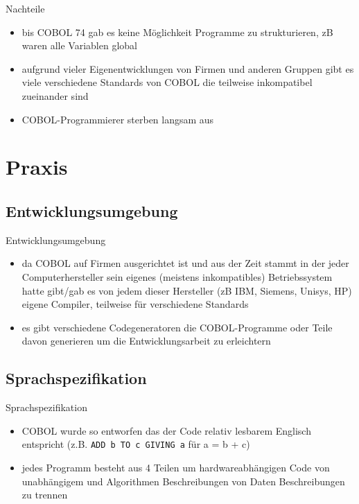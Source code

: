 \documentclass{beamer}
\begin{document}
\begin{frame}{Nachteile}
	\begin{itemize}
		\item
		    bis COBOL 74 gab es keine M\"oglichkeit Programme zu strukturieren, zB waren alle Variablen global
		\item
			aufgrund vieler Eigenentwicklungen von Firmen und anderen Gruppen gibt es viele verschiedene Standards von COBOL die teilweise inkompatibel zueinander sind
		\item
			COBOL-Programmierer sterben langsam aus
	\end{itemize}
\end{frame}

\section{Praxis}

\subsection{Entwicklungsumgebung}

\begin{frame}{Entwicklungsumgebung}
	\begin{itemize}
		\item
			da COBOL auf Firmen ausgerichtet ist und aus der Zeit stammt in der jeder Computerhersteller sein eigenes (meistens inkompatibles) Betriebssystem hatte gibt/gab es von jedem dieser Hersteller (zB IBM, Siemens, Unisys, HP) eigene Compiler, teilweise f\"ur verschiedene Standards
		\item
			es gibt verschiedene Codegeneratoren die COBOL-Programme oder Teile davon generieren um die Entwicklungsarbeit zu erleichtern
	\end{itemize}
\end{frame}

\subsection{Sprachspezifikation}

\begin{frame}{Sprachspezifikation}
	\begin{itemize}
		\item
			COBOL wurde so entworfen das der Code relativ lesbarem Englisch entspricht (z.B. \texttt{ADD b TO c GIVING a} f\"ur a = b + c)
		\item
			jedes Programm besteht aus 4 Teilen um hardwareabh\"angigen Code von unabh\"angigem und Algorithmen Beschreibungen von Daten Beschreibungen zu trennen
	\end{itemize}
\end{frame}
\end{document}
